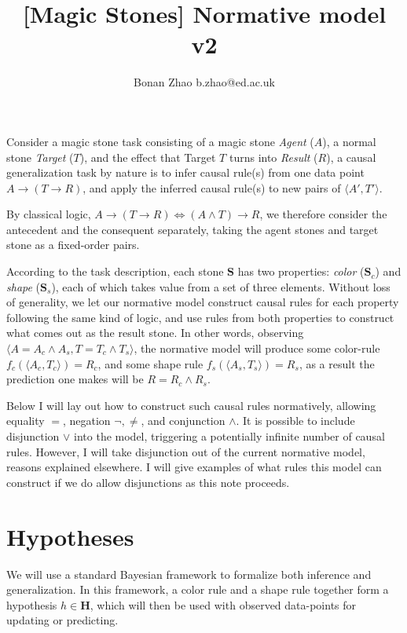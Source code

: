 \documentclass{article}
\title{[Magic Stones] Normative model v2}
\author{Bonan Zhao b.zhao@ed.ac.uk}
\begin{document}
\maketitle


Consider a magic stone task consisting of a magic stone \emph{Agent} ($A$), a normal stone \emph{Target} ($T$), and the effect that Target $T$ turns into \emph{Result} ($R$), a causal generalization task by nature is to infer causal rule(s) from one data point $A \to (T \to R)$, and apply the inferred causal rule(s) to new pairs of $\langle A', T' \rangle$.

By classical logic, $A \to (T \to R) \Leftrightarrow (A \wedge T) \to R$, we therefore consider the antecedent and the consequent separately, taking the agent stones and target stone as a fixed-order pairs.

According to the task description, each stone $\mathbf{S}$ has two properties: \emph{color} ($\mathbf{S}_c$) and \emph{shape} ($\mathbf{S}_s$), each of which takes value from a set of three elements. Without loss of generality, we let our normative model construct causal rules for each property following the same kind of logic, and use rules from both properties to construct what comes out as the result stone. 
%
In other words, observing $\langle A = A_c \wedge A_s, T = T_c \wedge T_s \rangle$, the normative model will produce some color-rule $f_c(\langle A_c, T_c \rangle) = R_c$, and some shape rule $f_s(\langle A_s, T_s \rangle) = R_s$, as a result the prediction one makes will be $R = R_c \wedge R_s$.

Below I will lay out how to construct such causal rules normatively, allowing equality $=$, negation $\neg, \neq$, and conjunction $\wedge$. It is possible to include disjunction $\vee$ into the model, triggering a potentially infinite number of causal rules. However, I will take disjunction out of the current normative model, reasons explained elsewhere. I will give examples of what rules this model can construct if we do allow disjunctions as this note proceeds.


\section*{Hypotheses}

We will use a standard Bayesian framework to formalize both inference and generalization.
%
In this framework, a color rule and a shape rule together form a hypothesis $h \in \mathbf{H}$, which will then be used with observed data-points for updating or predicting.
\end{document}
